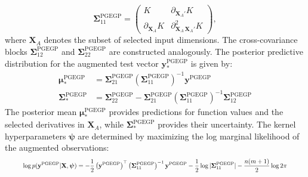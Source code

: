 \documentclass[12pt]{article}
\begin{document}
\begin{equation}
	\label{eqn:pgegp_S11}
	\boldsymbol{\Sigma}^{\text{PGEGP}}_{11} =
	\begin{pmatrix}
		K & \partial_{\mathbf{X}_A'} K \\
		\partial_{\mathbf{X}_A} K & \partial^2_{\mathbf{X}_A\,\mathbf{X}_A'} K
	\end{pmatrix},
\end{equation}
where $\mathbf{X}_A$ denotes the subset of selected input dimensions. The cross-covariance blocks $\boldsymbol{\Sigma}^{\text{PGEGP}}_{12}$ and $\boldsymbol{\Sigma}^{\text{PGEGP}}_{22}$ are constructed analogously. The posterior predictive distribution for the augmented test vector $\mathbf{y}^{\text{PGEGP}}_*$ is given by:
\begin{equation}
	\label{eqn:pgegp_posterior}
	\begin{split}
		\boldsymbol{\mu}_{*}^{\text{PGEGP}} &= \boldsymbol{\Sigma}^{\text{PGEGP}}_{21} \left(\boldsymbol{\Sigma}^{\text{PGEGP}}_{11}\right)^{-1} \mathbf{y}^{\text{PGEGP}} \\
		\boldsymbol{\Sigma}_{*}^{\text{PGEGP}} &= \boldsymbol{\Sigma}^{\text{PGEGP}}_{22} - \boldsymbol{\Sigma}^{\text{PGEGP}}_{21} \left(\boldsymbol{\Sigma}^{\text{PGEGP}}_{11}\right)^{-1} \boldsymbol{\Sigma}^{\text{PGEGP}}_{12}
	\end{split}
\end{equation}
The posterior mean $\boldsymbol{\mu}_{*}^{\text{PGEGP}}$ provides predictions for function values and the selected derivatives in $\mathbf{X}_A$, while $\boldsymbol{\Sigma}_{*}^{\text{PGEGP}}$ provides their uncertainty. The kernel hyperparameters $\boldsymbol{\psi}$ are determined by maximizing the log marginal likelihood of the augmented observations:
\begin{equation}
	\label{eqn:pgegp_mll}
	\resizebox{0.92\textwidth}{!}{$\displaystyle
	\log p(\mathbf{y}^{\text{PGEGP}}|\mathbf{X}, \boldsymbol{\psi}) = -\frac{1}{2} \left(\mathbf{y}^{\text{PGEGP}}\right)^\top \left(\boldsymbol{\Sigma}^{\text{PGEGP}}_{11}\right)^{-1} \mathbf{y}^{\text{PGEGP}} - \frac{1}{2}\log|\boldsymbol{\Sigma}^{\text{PGEGP}}_{11}| - \frac{n(m+1)}{2}\log 2\pi
	$}
\end{equation}
\end{document}
